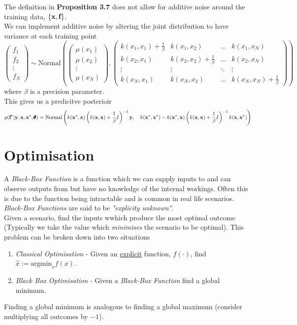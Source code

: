 \documentclass[11pt,a4paper]{article}
\begin{document}
The definition in \textbf{Proposition 3.7} does not allow for additive noise around the training data, $\{\textbf{x},\textbf{f}\}$.\\
We can implement additive noise by altering the joint distribution to have variance at each training point
$$\begin{pmatrix}f_1\\f_2\\\vdots\\f_N\end{pmatrix}\sim\text{Normal}\left(\begin{pmatrix}\mu(x_1)\\\mu(x_2)\\\vdots\\\mu(x_N)\end{pmatrix},\begin{pmatrix}k(x_1,x_1)+\frac{1}{\beta}&k(x_1,x_2)&\dots&k(x_1,x_N)\\k(x_2,x_1)&k(x_2,x_2)+\frac{1}{\beta}&\dots&k(x_2,x_N)\\\vdots&\vdots&\ddots&\vdots\\k(x_N,x_1)&k(x_N,x_2)&\dots&k(x_N,x_N)+\frac{1}{\beta}\end{pmatrix}\right)$$
where $\beta$ is a precision parameter.\\
This gives us a predicitve posterioir
$$p(\textbf{f}^*|\textbf{y},\textbf{x},\textbf{x}^*,\pmb\theta)=\text{Normal}\left(k(\textbf{x}^*,\textbf{x})\left(k(\textbf{x},\textbf{x})+\frac{1}{\beta}I\right)^{-1}\textbf{y},\quad k(\textbf{x}^*,\textbf{x}^*)-k(\textbf{x}^*,\textbf{x})\left(k(\textbf{x},\textbf{x})+\frac{1}{\beta}I\right)^{-1}k(\textbf{x},\textbf{x}^*)\right)$$

\section{Optimisation}

A \textit{Black-Box Function} is a function which we can supply inputs to and can observe outputs from but have no knowledge of the internal workings. Often this is due to the function being intractable and is common in real life scenarios.\\
\nb \textit{Black-Box Functions} are said to be \textit{"explicity unknown"}.\\

Given a scenario, find the inputs wwhich produce the most optimal outcome (Typically we take the value which \textit{minimises} the scenario to be optimal). This problem can be broken down into two situations
\begin{enumerate}
	\item \textit{Classical Optimisation} - Given an \underline{explicit} function, $f(\cdot)$, find $\hat{x}:=\text{argmin}_xf(x)$.
	\item \textit{Black Box Optimisation} - Given a \textit{Black-Box Function} find a global minimum.
\end{enumerate}
\nb Finding a global minimum is analogous to finding a global maximum (consider multiplying all outcomes by $-1$).\\
\end{document}
